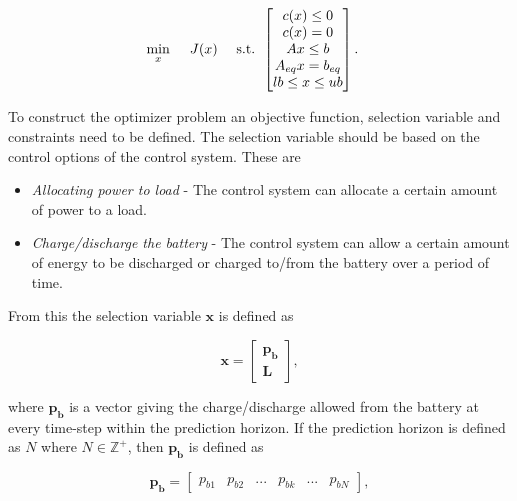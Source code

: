 \begin{align}
    \min_x\hspace{0.5cm} & J(x) &\text{   s.t.   } & \begin{bmatrix}
                                             c(x) \leq 0\\
                                             c(x) = 0\\
                                             Ax \leq b\\
                                             A_{eq}x = b_{eq}\\
                                             lb \leq x \leq ub
                                            \end{bmatrix}.
\end{align}

To construct the optimizer problem an objective function, selection variable and constraints need to be defined. The selection variable should be based on the control options of the control system. These are 
\begin{itemize}
    \item \textit{Allocating power to load} -   The control system can allocate a certain amount of power to a load.
    \item \textit{Charge/discharge the battery} - The control system can allow a certain amount of energy to be discharged or charged to/from the battery over a period of time.
\end{itemize}

From this the selection variable $\mathbf{x}$ is defined as 

\begin{equation}
    \mathbf{x} =    \begin{bmatrix}
                    \mathbf{p_b}\\
                    \mathbf{L}                    
                    \end{bmatrix},
\end{equation}

where $\mathbf{p_b}$ is a vector giving the charge/discharge allowed from the battery at every time-step within the prediction horizon. If the prediction horizon is defined as $N$ where $N\in\mathbb{Z^+}$, then $\mathbf{p_b}$ is defined as 

\begin{equation}
    \mathbf{p_b}    =   \begin{bmatrix}
                        p_{b1}&p_{b2}&...&p_{bk}&...&p_{bN}
                        \end{bmatrix},
\end{equation}


